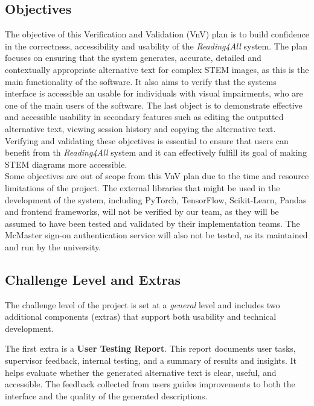 \documentclass[12pt, titlepage]{article}
\begin{document}
\subsection{Objectives}

The objective of this Verification and Validation (VnV) plan is to
build confidence in the correctness, accessibility and usability of
the \textit{Reading4All} system.
The plan focuses on ensuring that the system generates, accurate,
detailed and contextually appropriate alternative text for complex
STEM images, as this is the main functionality of the software.
It also aims to verify that the systems interface is accessible an
usable for individuals with visual impairments, who are one of the
main users of the software. The last object is to demonstrate
effective and accessible usability in secondary features
such as editing the outputted alternative text, viewing session
history and copying the alternative text.
Verifying and validating these objectives is essential to ensure that
users can benefit from th \textit{Reading4All} system and
it can effectively fulfill its goal of making STEM diagrams more accessible.
\\

Some objectives are out of scope from this VnV plan due to the time
and resource limitations of the project.
The external libraries that might be used in the development of the
system, including PyTorch, TensorFlow, Scikit-Learn, Pandas and
frontend frameworks, will not be verified by our team, as they will
be assumed to have been tested and validated by their implementation teams.
The McMaster sign-on authentication service will also not be tested,
as its maintained and run by the university.

\subsection{Challenge Level and Extras}

The challenge level of the project is set at a \textit{general} level and
includes two additional components (extras) that support both usability
and technical development.

The first extra is a \textbf{User Testing Report}. This report documents
user tasks, supervisor feedback, internal testing, and a summary of
results and insights. It helps evaluate whether the generated alternative
text is clear, useful, and accessible. The feedback collected from users
guides improvements to both the interface and the quality of the
generated descriptions.
\end{document}
